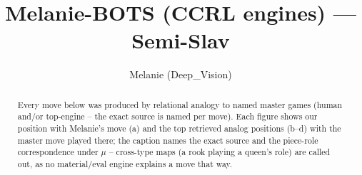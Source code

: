 \documentclass[11pt]{article}
\title{Melanie-BOTS (CCRL engines) — Semi-Slav}
\author{Melanie (Deep\_Vision)}
\date{}
\begin{document}
\maketitle

\begin{abstract}Every move below was produced by relational analogy to named master games (human and/or top-engine -- the exact source is named per move). Each figure shows our position with Melanie's move (a) and the top retrieved analog positions (b--d) with the master move played there; the caption names the exact source and the piece-role correspondence under $\mu$ -- cross-type maps (a rook playing a queen's role) are called out, as no material/eval engine explains a move that way.\end{abstract}

\begin{figure}[p]\centering
\begin{subfigure}{0.46\textwidth}\centering
\resizebox{\linewidth}{!}{%
\newchessgame
\chessboard[
  setfen={r1bqkb1r/pp1n1ppp/2p1pn2/8/2pP4/2NBPN2/PP3PPP/R1BQK2R w KQkq - 0 7},
  showmover=false,
  pgfstyle=straightmove, color=movearrow, markmove={d3-c4}
]}
\caption{}
\end{subfigure}\hfill
\begin{subfigure}{0.46\textwidth}\centering
\resizebox{\linewidth}{!}{%
\newchessgame
\chessboard[
  setfen={r1bqkb1r/pp1n1ppp/2p1pn2/8/2pP4/2NBPN2/PP3PPP/R1BQK2R w KQkq - 0 7},
  showmover=false,
  pgfstyle=straightmove, color=movearrow, markmove={d3-c4}
]}
\caption{}
\end{subfigure}
\\[4pt]
\begin{subfigure}{0.46\textwidth}\centering
\resizebox{\linewidth}{!}{%
\newchessgame
\chessboard[
  setfen={r1bqkb1r/pp1n1ppp/2p1pn2/8/2pP4/2NBPN2/PP3PPP/R1BQK2R w KQkq - 0 7},
  showmover=false,
  pgfstyle=straightmove, color=movearrow, markmove={d3-c4}
]}
\caption{}
\end{subfigure}\hfill
\begin{subfigure}{0.46\textwidth}\centering
\resizebox{\linewidth}{!}{%
\newchessgame
\chessboard[
  setfen={r1bqkb1r/pp1n1ppp/2p1pn2/8/2pP4/2NBPN2/PP3PPP/R1BQK2R w KQkq - 0 7},
  showmover=false,
  pgfstyle=straightmove, color=movearrow, markmove={d3-c4}
]}
\caption{}
\end{subfigure}

\end{figure}
\end{document}
